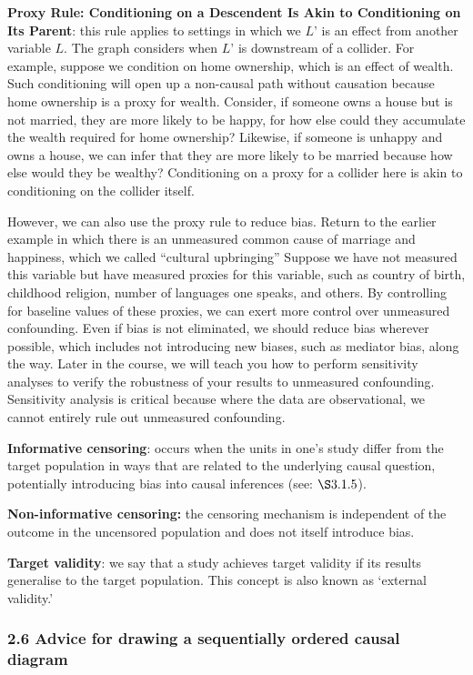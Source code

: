 \documentclass[
  singlecolumn]{article}
\begin{document}
\begin{enumerate}
  \textbf{Proxy Rule: Conditioning on a Descendent Is Akin to
  Conditioning on Its Parent}: this rule applies to settings in which we
  \(L’\) is an effect from another variable \(L\). The graph considers
  when \(L’\) is downstream of a collider. For example, suppose we
  condition on home ownership, which is an effect of wealth. Such
  conditioning will open up a non-causal path without causation because
  home ownership is a proxy for wealth. Consider, if someone owns a
  house but is not married, they are more likely to be happy, for how
  else could they accumulate the wealth required for home ownership?
  Likewise, if someone is unhappy and owns a house, we can infer that
  they are more likely to be married because how else would they be
  wealthy? Conditioning on a proxy for a collider here is akin to
  conditioning on the collider itself.
\end{enumerate}

However, we can also use the proxy rule to reduce bias. Return to the
earlier example in which there is an unmeasured common cause of marriage
and happiness, which we called ``cultural upbringing'' Suppose we have
not measured this variable but have measured proxies for this variable,
such as country of birth, childhood religion, number of languages one
speaks, and others. By controlling for baseline values of these proxies,
we can exert more control over unmeasured confounding. Even if bias is
not eliminated, we should reduce bias wherever possible, which includes
not introducing new biases, such as mediator bias, along the way. Later
in the course, we will teach you how to perform sensitivity analyses to
verify the robustness of your results to unmeasured confounding.
Sensitivity analysis is critical because where the data are
observational, we cannot entirely rule out unmeasured confounding.

\textbf{Informative censoring}: occurs when the units in one's study
differ from the target population in ways that are related to the
underlying causal question, potentially introducing bias into causal
inferences (see: \(\S 3.1.5\)).

\textbf{Non-informative censoring:} the censoring mechanism is
independent of the outcome in the uncensored population and does not
itself introduce bias.

\textbf{Target validity}: we say that a study achieves target validity
if its results generalise to the target population. This concept is also
known as `external validity.'

\subsubsection{2.6 Advice for drawing a sequentially ordered causal
diagram}\label{advice-for-drawing-a-sequentially-ordered-causal-diagram}
\end{document}
